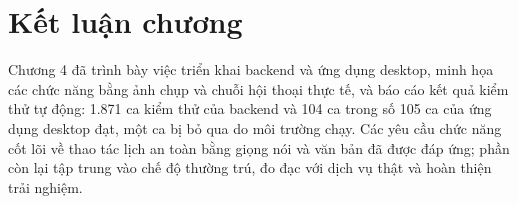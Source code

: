 \section{Kết luận chương}
Chương 4 đã trình bày việc triển khai backend và ứng dụng desktop, minh họa các chức năng bằng ảnh chụp và chuỗi hội thoại thực tế, và báo cáo kết quả kiểm thử tự động: 1.871 ca kiểm thử của backend và 104 ca trong số 105 ca của ứng dụng desktop đạt, một ca bị bỏ qua do môi trường chạy. Các yêu cầu chức năng cốt lõi về thao tác lịch an toàn bằng giọng nói và văn bản đã được đáp ứng; phần còn lại tập trung vào chế độ thường trú, đo đạc với dịch vụ thật và hoàn thiện trải nghiệm.
